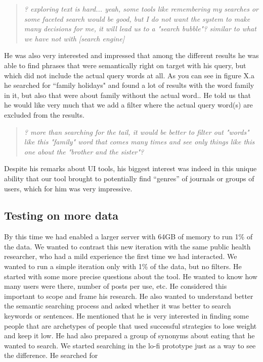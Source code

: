 \documentclass{sigchi}
\begin{document}
\begin{quote}
{\em
? exploring text is hard... yeah, some tools like remembering my searches or some faceted search would be good, but I do not want the system to make many decisions for me, it will lead us to a "search bubble"? similar to what we have not with [search engine]
}\end{quote}

He was also very interested and impressed that among the different results he was able to find phrases that were semantically right on target with his query, but which did not include the actual query words at all. As you can see in figure X.a he searched for ``family holidays" and found a lot of results with the word family in it, but also that were about family without the actual word.. He told us that he would like very much that we add a filter where the actual query word(s) are excluded from the results.

\begin{quote}
{\em
? more than searching for the tail, it would be better to filter out "words" like this "family" word that comes many times and see only things like this one about the "brother and the sister"?
}\end{quote}

Despite his remarks about UI tools, his biggest interest was indeed in this unique ability that our tool brought to potentially find ``genres'' of journals or groups of users, which for him was very impressive.

\subsection{Testing on more data}

By this time we had enabled a larger server with  64GB of memory to run 1\% of the data. We wanted to contrast this new iteration with the same public health researcher, who had a mild experience the first time we had interacted. We wanted to run a simple iteration only with 1\% of the data, but no filters. He started with some more precise questions about the tool. He wanted to know how many users were there, number of posts per use, etc. He considered this important to scope and frame his research. He also wanted to understand better the semantic searching process and asked whether it was better to search keywords or sentences. He mentioned that he is very interested in finding some people that are archetypes of people that used successful strategies to lose weight and keep it low. He had also prepared a group of synonyms about eating that he wanted to search. We started searching in the lo-fi prototype just as a way to see the difference. He searched for 
\end{document}
